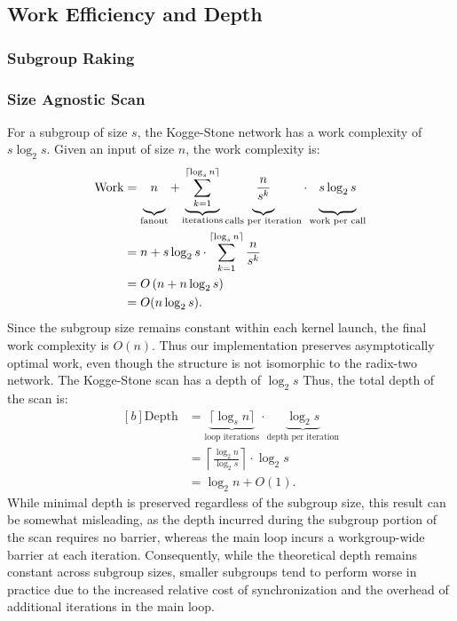 \documentclass[sigconf]{acmart}
\begin{document}
\subsection{Work Efficiency and Depth}
\subsubsection{Subgroup Raking}

\subsubsection{Size Agnostic Scan}
For a subgroup of size $s$, the Kogge-Stone network has a work complexity of $s \log_2 s$. Given an input of size $n$, the work complexity is:
\begin{equation}
  \begin{aligned}[b]
    \text{Work} & = \underbrace{\vphantom{\sum_{k=0}^{\lceil \log_s n \rceil}}n}_{\text{fanout}}
    +
    \underbrace{\sum_{k=1}^{\lceil \log_s n \rceil}}_{\text{iterations}}
    \underbrace{\vphantom{\sum_{k=1}^{\lceil \log_s n \rceil}}\frac{n}{s^k}}_{\text{calls per iteration}}
    \cdot
    \underbrace{\vphantom{\sum_{k=1}^{\lceil \log_s n \rceil}}s \log_2 s}_{\text{work per call}} \\
                & = n + s \log_2 s \cdot \sum_{k=1}^{\lceil \log_s n \rceil} \frac{n}{s^k}       \\
                & = O\left(n + n \log_2 s\right)                                                 \\
                & = O(n \log_2 s).
  \end{aligned}
\end{equation}
Since the subgroup size remains constant within each kernel launch, the final work complexity is $O(n)$. Thus our implementation preserves asymptotically optimal work, even though the structure is not isomorphic to the radix-two network. The Kogge-Stone scan has a depth of $\log_2 s$ Thus, the total depth of the scan is:
\begin{equation}
  \begin{aligned}[b]
    \text{Depth} & = \underbrace{\lceil \log_s n \rceil}_{\text{loop iterations}}
    \cdot \underbrace{\log_2 s}_{\text{depth per iteration}}                           \\
                 & = \left\lceil \frac{\log_2 n}{\log_2 s} \right\rceil \cdot \log_2 s \\
                 & = \log_2 n + O(1).
  \end{aligned}
\end{equation}
While minimal depth is preserved regardless of the subgroup size, this result can be somewhat misleading, as the depth incurred during the subgroup portion of the scan requires no barrier, whereas the main loop incurs a workgroup-wide barrier at each iteration. Consequently, while the theoretical depth remains constant across subgroup sizes, smaller subgroups tend to perform worse in practice due to the increased relative cost of synchronization and the overhead of additional iterations in the main loop.
\end{document}
